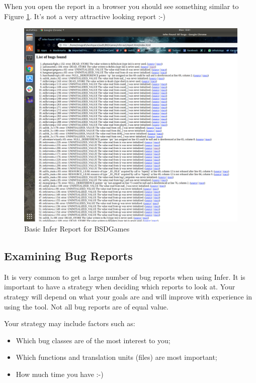 When you open the report in a browser you should see something similar to Figure \ref{fig:screen-one}.
It's not a very attractive looking report  :-)

\begin{figure}
	\centering
	\includegraphics[width=\linewidth]{./img/screen-one}
	\caption[Basic Report]{Basic Infer Report for BSDGames}
	\label{fig:screen-one}
\end{figure}

\vspace{1cm}

\subsection{Examining Bug Reports}

It is very common to get a large number of bug reports when using Infer. 
It is important to have a strategy when deciding which reports to look at.
Your strategy will depend on what your goals are and will improve with experience
in using the tool. Not all bug reports are of equal value.

Your strategy may include factors such as:
\begin{itemize}
	\item Which bug classes are of the most interest to you;
	\item Which functions and translation units (files) are most important;
	\item How much time you have :-)
\end{itemize}

